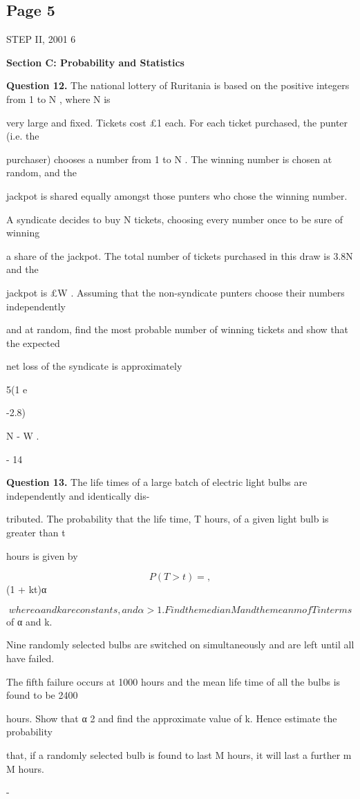 \documentclass[12pt]{article}
\begin{document}
\subsection*{Page 5}
\begin{flushleft}
STEP II, 2001 6\par
\bigskip\textbf{Section C: Probability and Statistics}\par
\bigskip\textbf{Question 12.} The national lottery of Ruritania is based on the positive integers from 1 to N , where N is\par
very large and fixed. Tickets cost \pounds 1 each. For each ticket purchased, the punter (i.e. the\par
purchaser) chooses a number from 1 to N . The winning number is chosen at random, and the\par
jackpot is shared equally amongst those punters who chose the winning number.\par
A syndicate decides to buy N tickets, choosing every number once to be sure of winning\par
a share of the jackpot. The total number of tickets purchased in this draw is 3.8N and the\par
jackpot is \pounds W . Assuming that the non-syndicate punters choose their numbers independently\par
and at random, find the most probable number of winning tickets and show that the expected\par
net loss of the syndicate is approximately\par
5(1 e\par
-2.8)\par
N - W .\par
- 14\par
\bigskip\textbf{Question 13.} The life times of a large batch of electric light bulbs are independently and identically dis-\par
tributed. The probability that the life time, T hours, of a given light bulb is greater than t\par
hours is given by\par
\[P(T > t) = ,\]
(1 + kt)α\par
\[where α and k are constants, and α > 1. Find the median M and the mean m of T in terms\]
of α and k.\par
Nine randomly selected bulbs are switched on simultaneously and are left until all have failed.\par
The fifth failure occurs at 1000 hours and the mean life time of all the bulbs is found to be 2400\par
hours. Show that α 2 and find the approximate value of k. Hence estimate the probability\par
\approx\par
that, if a randomly selected bulb is found to last M hours, it will last a further m M hours.\par
-\par
\end{flushleft}
\end{document}
